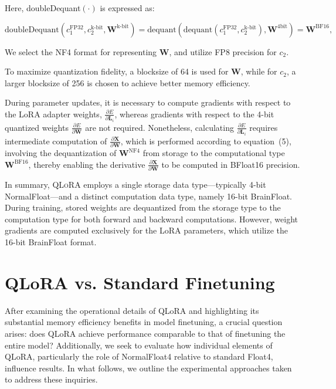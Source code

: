 Here, doubleDequant$(\cdot)$ is expressed as:

\begin{equation}
    \text{doubleDequant}(c_1^{\text{FP32}}, c_2^{\text{k-bit}}, \mathbf{W}^{\text{k-bit}}) = \text{dequant}(\text{dequant}(c_1^{\text{FP32}}, c_2^{\text{k-bit}}), \mathbf{W}^{\text{4bit}}) = \mathbf{W}^{\text{BF16}},
\end{equation}

We select the NF4 format for representing $\mathbf{W}$, and utilize FP8 precision for $c_2$.

To maximize quantization fidelity, a blocksize of 64 is used for $\mathbf{W}$, while for $c_2$, a larger blocksize of 256 is chosen to achieve better memory efficiency.

During parameter updates, it is necessary to compute gradients with respect to the LoRA adapter weights, $\frac{\partial E}{\partial \mathbf{L}_i}$, whereas gradients with respect to the 4-bit quantized weights $\frac{\partial E}{\partial \mathbf{W}}$ are not required. Nonetheless, calculating $\frac{\partial E}{\partial \mathbf{L}_i}$ requires intermediate computation of $\frac{\partial \mathbf{X}}{\partial \mathbf{W}}$, which is performed according to equation~(5), involving the dequantization of $\mathbf{W}^{\text{NF4}}$ from storage to the computational type $\mathbf{W}^{\text{BF16}}$, thereby enabling the derivative $\frac{\partial \mathbf{X}}{\partial \mathbf{W}}$ to be computed in BFloat16 precision.

In summary, \textsc{QLoRA} employs a single storage data type—typically 4-bit NormalFloat—and a distinct computation data type, namely 16-bit BrainFloat. During training, stored weights are dequantized from the storage type to the computation type for both forward and backward computations. However, weight gradients are computed exclusively for the LoRA parameters, which utilize the 16-bit BrainFloat format.

\section{QLoRA vs. Standard Finetuning}
\label{sec:comp_to_std}

After examining the operational details of QLoRA and highlighting its substantial memory efficiency benefits in model finetuning, a crucial question arises: does QLoRA achieve performance comparable to that of finetuning the entire model? Additionally, we seek to evaluate how individual elements of QLoRA, particularly the role of NormalFloat4 relative to standard Float4, influence results. In what follows, we outline the experimental approaches taken to address these inquiries.

